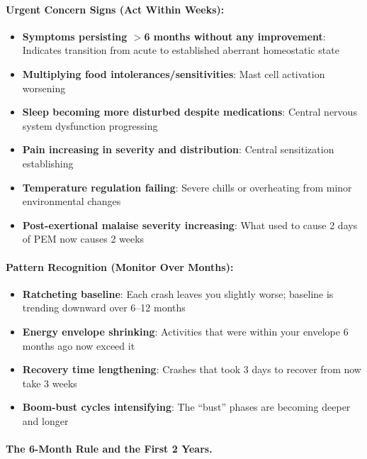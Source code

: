 \begin{requirement}
\paragraph{Urgent Concern Signs (Act Within Weeks):}
\begin{itemize}
    \item \textbf{Symptoms persisting $>$6 months without any improvement}: Indicates transition from acute to established aberrant homeostatic state~\cite{Maksoud2020natural}
    \item \textbf{Multiplying food intolerances/sensitivities}: Mast cell activation worsening
    \item \textbf{Sleep becoming more disturbed despite medications}: Central nervous system dysfunction progressing
    \item \textbf{Pain increasing in severity and distribution}: Central sensitization establishing
    \item \textbf{Temperature regulation failing}: Severe chills or overheating from minor environmental changes
    \item \textbf{Post-exertional malaise severity increasing}: What used to cause 2 days of PEM now causes 2 weeks
\end{itemize}

\paragraph{Pattern Recognition (Monitor Over Months):}
\begin{itemize}
    \item \textbf{Ratcheting baseline}: Each crash leaves you slightly worse; baseline is trending downward over 6--12 months
    \item \textbf{Energy envelope shrinking}: Activities that were within your envelope 6 months ago now exceed it
    \item \textbf{Recovery time lengthening}: Crashes that took 3 days to recover from now take 3 weeks
    \item \textbf{Boom-bust cycles intensifying}: The ``bust'' phases are becoming deeper and longer
\end{itemize}
\end{requirement}

\paragraph{The 6-Month Rule and the First 2 Years.}

